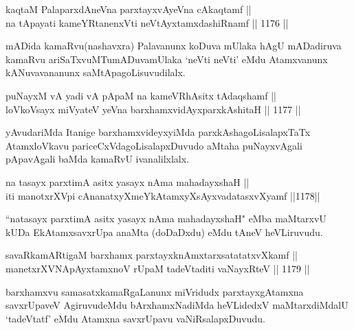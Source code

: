 
\begin{shl}
kaqtaM PalaparxdAneVna parxtayxvAyeVna cAkaqtamf ||  \\
na tApayati kameYRtanenxVti neVtAyxtamxdashiRnamf \hfill || 1176 ||  
\end{shl}

\begin{artha}
mADida kamaRvu(nashavxra) Palavanunx koDuva mUlaka hAgU mADadiruva kamaRvu ariSaTxvuMTumADuvamUlaka `neVti neVti' eMdu Atamxvanunx kANuvavananunx saMtApagoLisuvudilalx.
\end{artha}


\begin{shl}
puNayxM vA yadi vA pApaM na kameVRhAsitx tAdaqshamf ||  \\
loVkoV\s sayx miVyateV yeVna barxhamxvidAyxparxkAshitaH \hfill || 1177 ||  
\end{shl}

\begin{artha}
yAvudariMda Itanige barxhamxvideyxyiMda parxkAshagoLisalapxTaTx AtamxloVkavu pariceCxVdagoLisalapxDuvudo aMtaha puNayxvAgali pApavAgali baMda kamaRvU ivanalilxlalx.
\end{artha}


\begin{shl}
na tasayx parxtimA asitx yasayx nAma mahadayxshaH || \\
iti manotxrXV\s pi cA\s \s nanatxyXmeYkAtamxyXsAyxvadatasxvXyamf \hfill ||1178||  
\end{shl}

\begin{artha}
``natasayx parxtimA asitx yasayx nAma mahadayxshaH" eMba maMtarxvU kUDa EkAtamxsavxrUpa anaMta (doDaDxdu) eMdu tAneV heVLiruvudu.
\end{artha}

\begin{shl}
savaRkamARtigaM barxhamx parxtayxknAmxtarxsatatatxvXkamf || \\
manetxrXVNApAyxtamxnoV rUpaM tadeVtaditi vaNayxRteV \hfill || 1179 ||  
\end{shl}

\begin{artha}
barxhamxvu samasatxkamaRgaLanunx miVridudx parxtayxgAtamxna savxrUpaveV AgiruvudeMdu bArxhamxNadiMda heVLidedxV maMtarxdiMdalU `tadeVtatf' eMdu Atamxna savxrUpavu vaNiRsalapxDuvudu.
\end{artha}

